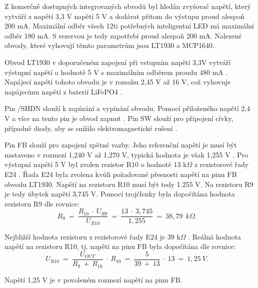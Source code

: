 Z komerčně dostupných integrovaných obvodů byl hledán zvyšovač napětí, který vytváří z napětí 3,3 V napětí 5 V a dodávat přitom do výstupu proud alespoň 200 mA. 
Maximální odběr všech 12ti potřebných inteligentní LED má maximální odběr 180 mA. S rezervou je tedy zapotřebí proud alespoň 200 mA. Nalezené obvody, které vyhovují 
těmto parametrům jsou LT1930 a MCP1640. 

Obvod LT1930 v doporučeném zapojení při vstupním napětí 3,3V vytváří výstupní napětí o hodnotě 5 V s maximálním odběrem proudu 480 mA \cite{LT1930_dtsh}. Napájecí napětí 
tohoto obvodu je v rozsahu 2,45 V až 16 V, což vyhovuje napájecímu napětí z baterií LiFePO4 \cite{LT1930_dtsh}.



Pin /SHDN slouží k zapínání a vypínání obvodu. Pomocí přiloženého napětí 2,4 V a více na tento pin je obvod zapnut \cite{LT1930_dtsh}. Pin SW slouží pro  připojení cívky, 
případně diody, aby se snížilo elektromagnetické rušení \cite{LT1930_dtsh}. 

Pin FB slouží  pro zapojení zpětné vazby. Jeho referenční napětí je musí být nastaveno v rozmezí 1,240 V až 1,270 V, typická hodnota je však 1,255 V \cite{LT1930_dtsh}. 
Pro výstupní napětí 5 V byl zvolen rezistor R10 o hodnotě 13 k$\Omega$ z rezistorové řady E24 \cite{rezistorova_rada}. Řada E24 byla zvolena kvůli požadované přesnosti
napětí na pinu FB obvodu LT1930. Napětí na rezistoru R10 musí být tedy 1.255 V. Na rezistoru R9 je tedy úbytek napětí 3,745 V. Pomocí trojčlenky byla dopočítána hodnota 
rezistoru R9 dle rovnice:
\begin{equation} 
  R_{9}~=~\frac{R_{10}~\cdot~U_{R9}}{U_{R10}}~=~\frac{13~\cdot~3,745}{1,255}~=~38,79~\:k\Omega. 
  \quad
\label{eq:R9}
\end{equation}

Nejbližší hodnota rezistoru z rezistorové řady E24 je 39 k$\Omega$ \cite{rezistorova_rada}. Reálná hodnota napětí na rezistoru R10, tj. napětí na pinu FB byla dopočítána
dle rovnice:
\begin{equation} 
  U_{R10}~=~\frac{U_{OUT}}{R_{9}~+~R_{10}}~\cdot~R_{10}~=~\frac{5}{39~+~13}~\cdot~13~=~1,25~V. 
  \quad
\label{eq:UR10}
\end{equation}

Napětí 1,25 V je v povoleném rozmezí napětí na pinu FB. 

